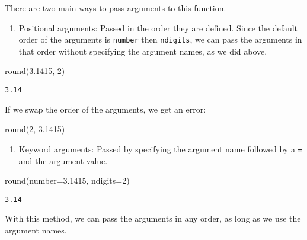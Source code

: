 \documentclass[
  letterpaper,
  DIV=11,
  numbers=noendperiod]{scrreprt}
\newenvironment{Shaded}{\begin{snugshade}}{\end{snugshade}}
\newcommand{\BuiltInTok}[1]{\textcolor[rgb]{0.00,0.23,0.31}{#1}}
\newcommand{\DecValTok}[1]{\textcolor[rgb]{0.68,0.00,0.00}{#1}}
\newcommand{\FloatTok}[1]{\textcolor[rgb]{0.68,0.00,0.00}{#1}}
\newcommand{\NormalTok}[1]{\textcolor[rgb]{0.00,0.23,0.31}{#1}}
\newcommand{\OperatorTok}[1]{\textcolor[rgb]{0.37,0.37,0.37}{#1}}
\providecommand{\tightlist}{%
  \setlength{\itemsep}{0pt}\setlength{\parskip}{0pt}}\usepackage{longtable,booktabs,array}
\begin{document}
There are two main ways to pass arguments to this function.

\begin{enumerate}
\def\labelenumi{\arabic{enumi}.}
\tightlist
\item
  Positional arguments: Passed in the order they are defined. Since the
  default order of the arguments is \texttt{number} then
  \texttt{ndigits}, we can pass the arguments in that order without
  specifying the argument names, as we did above.
\end{enumerate}

\begin{Shaded}
\begin{Highlighting}[]
\BuiltInTok{round}\NormalTok{(}\FloatTok{3.1415}\NormalTok{, }\DecValTok{2}\NormalTok{)}
\end{Highlighting}
\end{Shaded}

\begin{verbatim}
3.14
\end{verbatim}

If we swap the order of the arguments, we get an error:

\begin{Shaded}
\begin{Highlighting}[]
\BuiltInTok{round}\NormalTok{(}\DecValTok{2}\NormalTok{, }\FloatTok{3.1415}\NormalTok{)}
\end{Highlighting}
\end{Shaded}

\begin{enumerate}
\def\labelenumi{\arabic{enumi}.}
\setcounter{enumi}{1}
\tightlist
\item
  Keyword arguments: Passed by specifying the argument name followed by
  a \texttt{=} and the argument value.
\end{enumerate}

\begin{Shaded}
\begin{Highlighting}[]
\BuiltInTok{round}\NormalTok{(number}\OperatorTok{=}\FloatTok{3.1415}\NormalTok{, ndigits}\OperatorTok{=}\DecValTok{2}\NormalTok{)}
\end{Highlighting}
\end{Shaded}

\begin{verbatim}
3.14
\end{verbatim}

With this method, we can pass the arguments in any order, as long as we
use the argument names.
\end{document}
